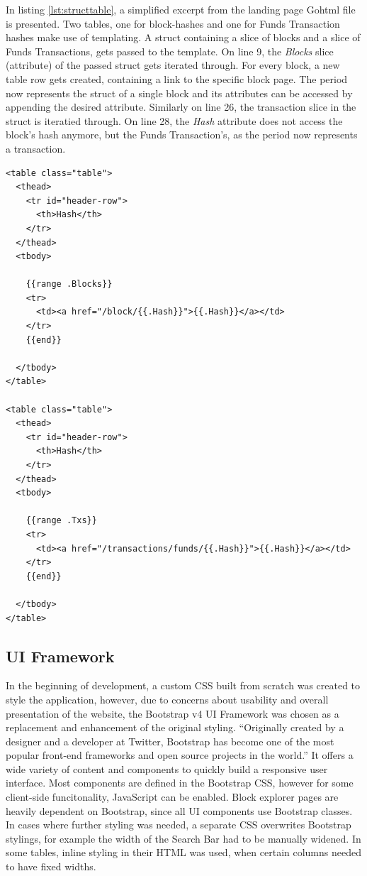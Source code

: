 In listing \ref{lst:structtable}, a simplified excerpt from the landing page Gohtml file is presented. Two tables, one for block-hashes and one for Funds Transaction hashes make use of templating. A struct containing a slice of blocks and a slice of Funds Transactions, gets passed to the template. On line 9, the \emph{Blocks} slice (attribute) of the passed struct gets iterated through. For every block, a new table row gets created, containing a link to the specific block page. The period now represents the struct of a single block and its attributes can be accessed by appending the desired attribute. Similarly on line 26, the transaction slice in the struct is iteratied through. On line 28, the \emph{Hash} attribute does not access the block's hash anymore, but the Funds Transaction's, as the period now represents a transaction.

\begin{lstlisting}[caption={Block and Funds Transaction Tables Accessing a \emph{blocksandtx} Struct},captionpos=b,label={lst:structtable}]
<table class="table">
  <thead>
    <tr id="header-row">
      <th>Hash</th>
    </tr>
  </thead>
  <tbody>
  
    {{range .Blocks}}
    <tr>
      <td><a href="/block/{{.Hash}}">{{.Hash}}</a></td>
    </tr>
    {{end}}
    
  </tbody>
</table>

<table class="table">
  <thead>
    <tr id="header-row">
      <th>Hash</th>
    </tr>
  </thead>
  <tbody>
  
    {{range .Txs}}
    <tr>
      <td><a href="/transactions/funds/{{.Hash}}">{{.Hash}}</a></td>
    </tr>
    {{end}}
    
  </tbody>
</table>
\end{lstlisting}

\subsection{UI Framework} \label{sec:uiframeworks}
In the beginning of development, a custom CSS built from scratch was created to style the application, however, due to concerns about usability and overall presentation of the website, the Bootstrap v4 UI Framework \cite{bootstrap} was chosen as a replacement and enhancement of the original styling.
``Originally created by a designer and a developer at Twitter, Bootstrap has become one of the most popular front-end frameworks and open source projects in the world.'' \cite{bootstraphistory}
It offers a wide variety of content and components to quickly build a responsive user interface. Most components are defined in the Bootstrap CSS, however for some client-side funcitonality, JavaScript can be enabled. Block explorer pages are heavily dependent on Bootstrap, since all UI components use Bootstrap classes. In cases where further styling was needed, a separate CSS overwrites Bootstrap stylings, for example the width of the Search Bar had to be manually widened. In some tables, inline styling in their HTML was used, when certain columns needed to have fixed widths.

